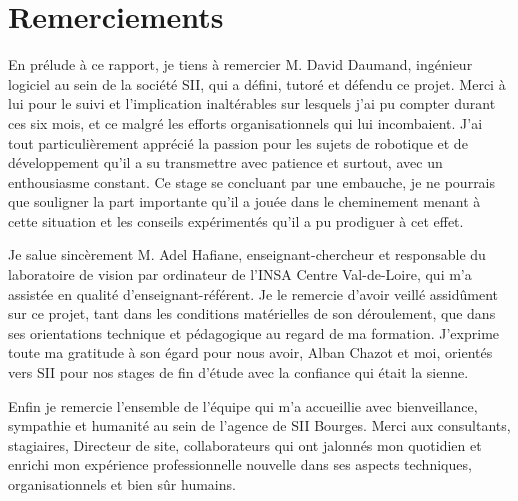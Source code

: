 \chapter*{Remerciements}
En prélude à ce rapport, je tiens à remercier M. David Daumand, ingénieur logiciel au sein de la société \gls{SII}, qui a défini, tutoré et défendu ce projet. 
Merci à lui pour le suivi et l'implication inaltérables sur lesquels j'ai pu compter durant ces six mois, et ce malgré les efforts organisationnels qui lui incombaient.
J'ai tout particulièrement apprécié la passion pour les sujets de robotique et de développement qu'il a su transmettre avec patience et surtout, avec un enthousiasme constant.
Ce stage se concluant par une embauche, je ne pourrais que souligner la part importante qu'il a jouée dans le cheminement menant à cette situation et les conseils expérimentés qu'il a pu prodiguer à cet effet. 

Je salue sincèrement M. Adel Hafiane, enseignant-chercheur et responsable du laboratoire de vision par ordinateur de l'INSA Centre Val-de-Loire, qui m'a assistée en qualité d'enseignant-référent.
Je le remercie d'avoir veillé assidûment sur ce projet, tant dans les conditions matérielles de son déroulement, que dans ses orientations technique et pédagogique au regard de ma formation. 
J'exprime toute ma gratitude à son égard pour nous avoir, Alban Chazot et moi, orientés vers \gls{SII} pour nos stages de fin d'étude avec la confiance qui était la sienne. 

Enfin je remercie l'ensemble de l'équipe qui m'a accueillie avec bienveillance, sympathie et humanité au sein de l'agence de \gls{SII} Bourges. 
Merci aux consultants, stagiaires, Directeur de site, collaborateurs 
qui ont jalonnés mon quotidien et enrichi mon expérience professionnelle nouvelle dans ses aspects techniques, organisationnels et bien sûr humains. 